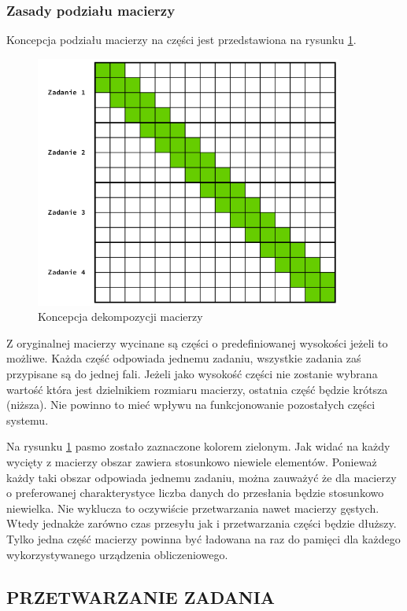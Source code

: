 \documentclass[12pt,a4paper,twoside]{article}
\begin{document}
\subsubsection{Zasady podziału macierzy}

Koncepcja podziału macierzy na części jest przedstawiona na rysunku \ref{fig:dekompozycja}. 
\begin{figure}
  \centering
    \includegraphics[width=0.90\textwidth]{dekompozycja}
  \caption{Koncepcja dekompozycji macierzy}
  \label{fig:dekompozycja}
\end{figure}
Z oryginalnej macierzy wycinane są części o predefiniowanej wysokości jeżeli to możliwe. Każda część odpowiada jednemu zadaniu, wszystkie zadania zaś przypisane są do jednej fali. Jeżeli jako wysokość części nie zostanie wybrana wartość która jest dzielnikiem rozmiaru macierzy, ostatnia część będzie krótsza (niższa). Nie powinno to mieć wpływu na funkcjonowanie pozostałych części systemu.

Na rysunku \ref{fig:dekompozycja} pasmo zostało zaznaczone kolorem zielonym. Jak widać na każdy wycięty z macierzy obszar zawiera stosunkowo niewiele elementów. Ponieważ każdy taki obszar odpowiada jednemu zadaniu, można zauważyć że dla macierzy o preferowanej charakterystyce liczba danych do przesłania będzie stosunkowo niewielka. Nie wyklucza to oczywiście przetwarzania nawet macierzy gęstych. Wtedy jednakże zarówno czas przesyłu jak i przetwarzania części będzie dłuższy. Tylko jedna część macierzy powinna być ładowana na raz do pamięci dla każdego wykorzystywanego urządzenia obliczeniowego.

\subsection{PRZETWARZANIE ZADANIA}
\label{sec:singletask}
\end{document}

